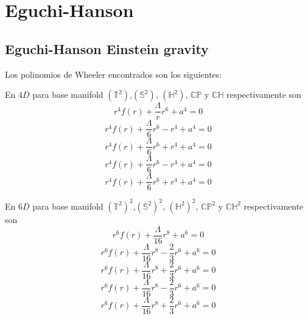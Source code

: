 \newpage
\chapter{Eguchi-Hanson}
\section{Eguchi-Hanson Einstein gravity}
Los polinomios de Wheeler encontrados son los siguientes:

En $4 D$ para base manifold $(\mathbb{T}^2)$,$(\mathbb{S}^2)$, $(\mathbb{H}^2)$, $\mathbb{CP}$ y $\mathbb{CH}$ respectivamente son
\begin{equation*}
    r^4f(r)+\frac{\Lambda}{r}r^6+a^4=0
\end{equation*}
\begin{equation*}
    r^4f(r)+\frac{\Lambda}{6}r^6-r^4+a^4=0
\end{equation*}
\begin{equation*}
    r^4f(r)+\frac{\Lambda}{6}r^6+r^4+a^4=0
\end{equation*}
\begin{equation*}
    r^4f(r)+\frac{\Lambda}{6}r^6-r^4+a^4=0
\end{equation*}
\begin{equation*}
    r^4f(r)+\frac{\Lambda}{6}r^6+r^4+a^4=0
\end{equation*}

En $6 D$ para base manifold $(\mathbb{T}^2)^2$,$(\mathbb{S}^2)^2$, $(\mathbb{H}^2)^2$, $\mathbb{CP}^2$ y $\mathbb{CH}^2$ respectivamente son
\begin{equation*}
    r^6f(r)+\frac{\Lambda}{16}r^8+a^6=0
\end{equation*}
\begin{equation*}
    r^6f(r)+\frac{\Lambda}{16}r^8-\frac{2}{3}r^6+a^6=0
\end{equation*}
\begin{equation*}
    r^6f(r)+\frac{\Lambda}{16}r^8+\frac{2}{3}r^6+a^6=0
\end{equation*}
\begin{equation*}
    r^6f(r)+\frac{\Lambda}{16}r^8-\frac{2}{3}r^6+a^6=0
\end{equation*}
\begin{equation*}
    r^6f(r)+\frac{\Lambda}{16}r^8+\frac{2}{3}r^6+a^6=0
\end{equation*}

